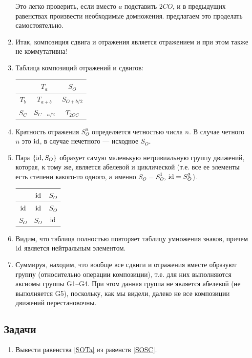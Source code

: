 \begin{enumerate}
Это легко проверить, если вместо $a$ подставить $2CO$, и в предыдущих равенствах произвести необходимые домножения. предлагаем это проделать самостоятельно.
\item Итак, композиция сдвига и отражения является отражением и при этом также не коммутативна!
\item Таблица композиций отражений и сдвигов:
\begin{center}
\begin{tabular}{c|c|c|}
  & $T_a$ & $S_O$ \\
 \hline
$T_b$ & $T_{a+b}$ & $S_{O+b/2}$ \\
 \hline
$S_C$ & $S_{C-a/2}$ & $T_{2OC}$ \\
\hline
\end{tabular}
\end{center}
\item Кратность отражения $S_O^n$ определяется четностью числа $n$. В случае четного $n$ это $\mathrm{id}$, в случае нечетного --- исходное $S_O$.
\item Пара $\{\mathrm{id}, S_O\}$ образует самую маленькую нетривиальную группу движений, которая, к тому же, является абелевой и циклической (т.е. все ее элементы есть степени какого-то одного, а именно $S_O=S_O^1$, $\mathrm{id}=S_O^2$).
\begin{table}[htb!]\begin{center}
\begin{tabular}{c|c|c|}
  & $\mathrm{id}$ & $S_O$ \\
 \hline
$\mathrm{id}$ & $\mathrm{id}$ & $S_O$ \\
 \hline
$S_O$ & $S_O$ & $\mathrm{id}$ \\
\hline
\end{tabular}
\end{center}\end{table}
\item Видим, что таблица полностью повторяет таблицу умножения знаков, причем $\mathrm{id}$ является нейтральным элементом.
\item Суммируя, находим, что вообще все сдвиги и отражения вместе образуют группу (относительно операции композиции), т.е. для них выполняются аксиомы группы G1--G4. При этом данная группа не является абелевой (не выполняется G5), поскольку, как мы видели, далеко не все композиции движений перестановочны.
\end{enumerate}

\subsection*{Задачи}
\begin{enumerate}
\item Вывести равенства \eqref{SOTa} из равенств \eqref{SOSC}.
\end{enumerate}

